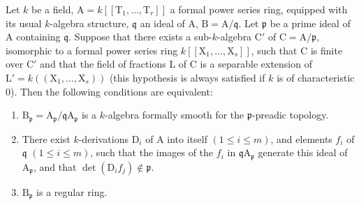 \begin{proposition}[22.7.2]
\label{0.22.7.2}
Let $k$ be a field, $\mathrm{A}=k[[\mathrm{T}_1,\ldots,\mathrm{T}_r]]$ a formal power series ring, equipped with its usual $k$-algebra structure, $\mathfrak{q}$ an ideal of $\mathrm{A}$, $\mathrm{B}=\mathrm{A}/\mathfrak{q}$.
Let $\mathfrak{p}$ be a prime ideal of $\mathrm{A}$ containing $\mathfrak{q}$.
Suppose that there exists a sub-$k$-algebra $\mathrm{C}'$ of $\mathrm{C}=\mathrm{A}/\mathfrak{p}$, isomorphic to a formal power series ring $k[[\mathrm{X}_1,\ldots,\mathrm{X}_s]]$, such that $\mathrm{C}$ is finite over $\mathrm{C}'$ and that the field of fractions $\mathrm{L}$ of $\mathrm{C}$ is a separable extension of $\mathrm{L}'=k((\mathrm{X}_1,\ldots,\mathrm{X}_s))$ (this hypothesis is always satisfied if $k$ is of characteristic $0$).
Then the following conditions are equivalent:
\begin{enumerate}
  \item[a)] $\mathrm{B}_\mathfrak{p}=\mathrm{A}_\mathfrak{p}/\mathfrak{q}\mathrm{A}_\mathfrak{p}$ is a $k$-algebra formally smooth for the $\mathfrak{p}$-preadic topology.
  \item[b)] There exist $k$-derivations $\mathrm{D}_i$ of $\mathrm{A}$ into itself $(1\leq i\leq m)$, and elements $f_i$ of $\mathfrak{q}$ $(1\leq i\leq m)$, such that the images of the $f_i$ in $\mathfrak{q}\mathrm{A}_\mathfrak{p}$ generate this ideal of $\mathrm{A}_\mathfrak{p}$, and that $\det(\mathrm{D}_if_j)\notin\mathfrak{p}$.
  \item[c)] $\mathrm{B}_\mathfrak{p}$ is a regular ring.
\end{enumerate}
\end{proposition}

